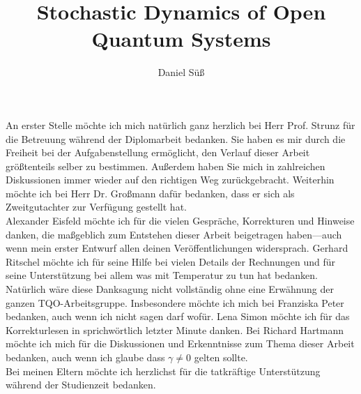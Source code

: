 \documentclass[a4paper,11pt,BCOR=8mm,twoside,headsepline]{scrbook}
\author{Daniel Süß}
\title{Stochastic Dynamics of Open Quantum Systems}
\theoremstyle{remark}
\begin{document}
\frontmatter

\mainmatter
\newpage







\appendix



%


\newpage
\section*{}\bigskip
\thispagestyle{empty}

An erster Stelle möchte ich mich natürlich ganz herzlich bei Herr Prof. Strunz für die Betreuung während der Diplomarbeit bedanken.
Sie haben es mir durch die Freiheit bei der Aufgabenstellung ermöglicht, den Verlauf dieser Arbeit größtenteils selber zu bestimmen.
Außerdem haben Sie mich in zahlreichen Diskussionen immer wieder auf den richtigen Weg zurückgebracht.
Weiterhin möchte ich bei Herr Dr. Großmann dafür bedanken, dass er sich als Zweitgutachter zur Verfügung gestellt hat.\\

Alexander Eisfeld möchte ich für die vielen Gespräche, Korrekturen und Hinweise danken, die maßgeblich zum Entstehen dieser Arbeit beigetragen haben---auch wenn mein erster Entwurf allen deinen Veröffentlichungen widersprach.
Gerhard Ritschel möchte ich für seine Hilfe bei vielen Details der Rechnungen und für seine Unterstützung bei allem was mit Temperatur zu tun hat bedanken.\\

Natürlich wäre diese Danksagung nicht vollständig ohne eine Erwähnung der ganzen TQO-Arbeitsgruppe.
Insbesondere möchte ich mich bei Franziska Peter bedanken, auch wenn ich nicht sagen darf wofür.
Lena Simon möchte ich für das Korrekturlesen in sprichwörtlich letzter Minute danken.
Bei Richard Hartmann möchte ich mich für die Diskussionen und Erkenntnisse zum Thema dieser Arbeit bedanken, auch wenn ich glaube dass $\gamma \neq 0$ gelten sollte.\\

Bei meinen Eltern möchte ich herzlichst für die tatkräftige Unterstützung während der Studienzeit bedanken.





%
%
\end{document}
